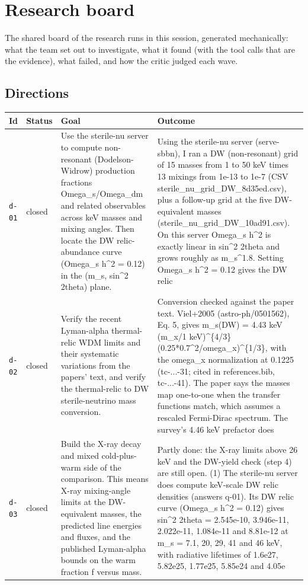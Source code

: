 \documentclass[11pt,a4paper]{article}
\begin{document}
\section{Research board}
\label{app:board}
The shared board of the research runs in this session, generated mechanically: what the team set out to investigate, what it found (with the tool calls that are the evidence), what failed, and how the critic judged each wave.
\subsection{Directions}
\begin{longtable}{@{}p{}p{}p{}p{}@{}}
\toprule Id & Status & Goal & Outcome \\ \midrule \endhead
\texttt{d-01} & closed & Use the sterile-nu server to compute non-resonant (Dodelson-Widrow) production fractions Omega\_s/Omega\_dm and related observables across keV masses and mixing angles. Then locate the DW relic-abundance curve (Omega\_s h\textasciicircum{}2 = 0.12) in the (m\_s, sin\textasciicircum{}2 2theta) plane. & Using the sterile-nu server (serve-sbbn), I ran a DW (non-resonant) grid of 15 masses from 1 to 50 keV times 13 mixings from 1e-13 to 1e-7 (CSV sterile\_nu\_grid\_DW\_8d35ed.csv), plus a follow-up grid at the five DW-equivalent masses (sterile\_nu\_grid\_DW\_10ad91.csv). On this server Omega\_s h\textasciicircum{}2 is exactly linear in sin\textasciicircum{}2 2theta and grows roughly as m\_s\textasciicircum{}1.8. Setting Omega\_s h\textasciicircum{}2 = 0.12 gives the DW relic \\
\texttt{d-02} & closed & Verify the recent Lyman-alpha thermal-relic WDM limits and their systematic variations from the papers' text, and verify the thermal-relic to DW sterile-neutrino mass conversion. & Conversion checked against the paper text. Viel+2005 (astro-ph/0501562), Eq. 5, gives m\_s(DW) = 4.43 keV (m\_x/1 keV)\textasciicircum{}\{4/3\} (0.25*0.7\textasciicircum{}2/omega\_x)\textasciicircum{}\{1/3\}, with the omega\_x normalization at 0.1225 (tc-...-31; cited in references.bib, tc-...-41). The paper says the masses map one-to-one when the transfer functions match, which assumes a rescaled Fermi-Dirac spectrum. The survey's 4.46 keV prefactor does \\
\texttt{d-03} & closed & Build the X-ray decay and mixed cold-plus-warm side of the comparison. This means X-ray mixing-angle limits at the DW-equivalent masses, the predicted line energies and fluxes, and the published Lyman-alpha bounds on the warm fraction f versus mass. & Partly done: the X-ray limits above 26 keV and the DW-yield check (step 4) are still open. (1) The sterile-nu server does compute keV-scale DW relic densities (answers q-01). Its DW relic curve (Omega\_s h\textasciicircum{}2 = 0.12) gives sin\textasciicircum{}2 2theta = 2.545e-10, 3.946e-11, 2.022e-11, 1.084e-11 and 8.81e-12 at m\_s = 7.1, 20, 29, 41 and 46 keV, with radiative lifetimes of 1.6e27, 5.82e25, 1.77e25, 5.85e24 and 4.05e \\

\end{longtable}
\end{document}
